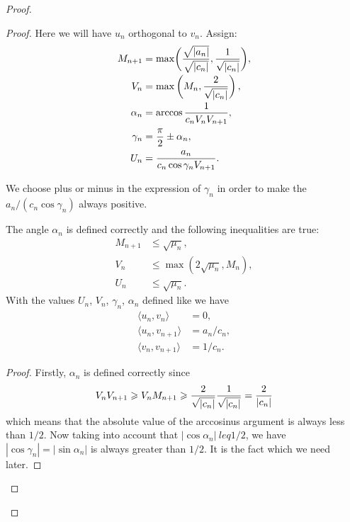 \documentclass[12pt]{amsart}
\theoremstyle{case}
\begin{document}
\begin{proof}
\begin{proof}
        Here we will have $u_n$ orthogonal to $v_n$.
        Assign:
        \begin{align*}
          M_{n+1} &= \max\biggl(\smash[b]{\frac{\sqrt{|a_n|}}{\sqrt{|c_n|}}}, \frac{1}{\sqrt{\smash[b]{|c_n|}}}\biggr),\\
          V_n &= \max\left(M_n, \frac{2}{\sqrt{\smash[b]{|c_n|}}}\right),\\
          \alpha_n &= \arccos{\frac{1}{c_n V_n V_{n+1}}},\\
          \gamma_n &= \frac{\pi}{2} \pm \alpha_n,\\
          U_n &= \frac{a_n}{c_n \cos{\gamma_n} V_{n+1}}.
        \end{align*}
        \begin{remark*}
          We choose plus or minus in the expression of $\gamma_n$ in order to make the $a_n/(c_n \cos{\gamma_n})$ always positive.
        \end{remark*}
        \begin{prop}
          The angle $\alpha_n$ is defined correctly and the following inequalities are true:
          \begin{align*}
              M_{n+1} &\leq \sqrt{\mu_n},\\
              V_n &\leq \max(2\sqrt{\mu_n}, M_n),\\
              U_n &\leq \sqrt{\mu_n}.
          \end{align*}
          With the values $U_n$, $V_n$, $\gamma_n$, $\alpha_n$ defined like we have
          \begin{align*}
            \langle u_n, v_n \rangle &= 0,\\
            \langle u_n, v_{n+1} \rangle &= a_n/c_n,\\
            \langle v_n, v_{n+1} \rangle &= 1/c_n.
          \end{align*}
        \end{prop}
        \begin{proof}
          Firstly, $\alpha_n$ is defined correctly since
          \[
            V_n V_{n+1} \geq V_n M_{n+1} \geq \frac{2}{\sqrt{\smash[b]{|c_n|}}} \frac{1}{\sqrt{\smash[b]{|c_n|}}} = \frac{2}{|c_n|}
          \]
          which means that the absolute value of the arccosinus argument is always less than $1/2$.
          Now taking into account that $|\cos{\alpha_n}| \ leq 1/2$, we have $|\cos{\gamma_n}| = |\sin{\alpha_n}|$ is always greater than $1/2$.
          It is the fact which we need later.
          

\end{proof}
\end{proof}
\end{proof}
\end{document}
